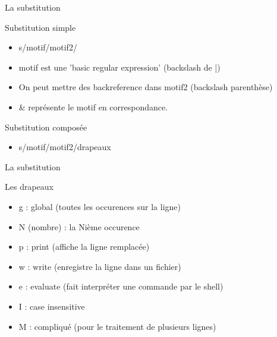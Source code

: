 \def\ftitle{La substitution}
\begin{frame}[containsverbatim]{\ftitle}
\def\blocktitle{Substitution simple}
\begin{block}{\blocktitle}
\begin{itemize}
\item s/motif/motif2/
\item motif est une 'basic regular expression' (backslash de |)
\item On peut mettre des backreference dans motif2 (backslash parenthèse)
\item \& représente le motif en correspondance.
\end{itemize}
\end{block}
\def\blocktitle{Substitution composée}
\begin{block}{\blocktitle}
\begin{itemize}
\item s/motif/motif2/drapeaux
\end{itemize}
\end{block}
\end{frame}



\begin{frame}[containsverbatim]{\ftitle}
\def\blocktitle{Les drapeaux}
\begin{block}{\blocktitle}
\begin{itemize}
\item g : global (toutes les occurences sur la ligne)
\item N (nombre) : la Nième occurence
\item p : print (affiche la ligne remplacée)
\item w : write (enregistre la ligne dans un fichier)
\item e : evaluate (fait interpréter une commande par le shell)
\item I : case insensitive
\item M : compliqué (pour le traitement de plusieurs lignes)
\end{itemize}
\end{block}
\end{frame}



